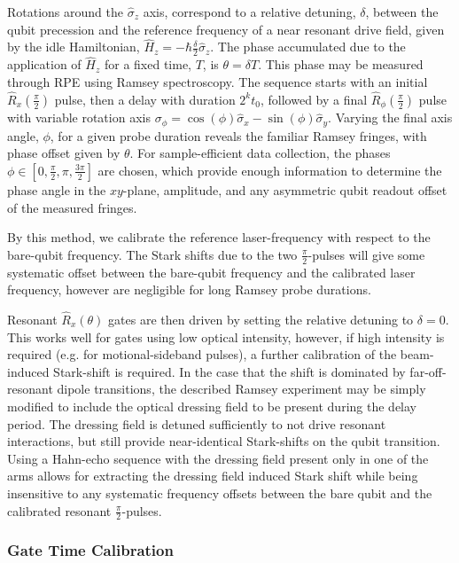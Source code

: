 Rotations around the $\hat\sigma_z$ axis, correspond to a relative detuning,
$\delta$, between the qubit precession and the reference frequency of a near resonant drive field, given by
the idle Hamiltonian, $\hat H_z = -\hbar\frac{\delta}{2}\hat\sigma_z$. The phase
accumulated due to the application of $\hat H_z$ for a fixed time, $T$, is
$\theta = \delta T$. This phase may be measured through RPE using Ramsey
spectroscopy. The sequence starts with an initial $\hat R_x(\frac{\pi}{2})$ pulse,
then a delay with duration $2^kt_0$, followed by a final $\hat R_\phi(\frac{\pi}{2})$
pulse with variable rotation axis $\sigma_\phi = \cos(\phi)\hat\sigma_x -
\sin(\phi)\hat\sigma_y$. Varying the final axis angle, $\phi$, for a given probe
duration reveals the familiar Ramsey fringes, with phase offset given by
$\theta$. For sample-efficient data collection, the phases
$\phi\in[0,\frac{\pi}{2},\pi,\frac{3\pi}{2}]$ are chosen, which provide enough
information to determine the phase angle in the $xy$-plane, amplitude, and any asymmetric qubit readout
offset of the measured fringes.

By this method, we calibrate the reference laser-frequency with respect to the
bare-qubit frequency. The Stark shifts due to the two $\frac{\pi}{2}$-pulses will
give some systematic offset between the bare-qubit frequency and the calibrated
laser frequency, however are negligible for long Ramsey probe durations.

Resonant $\hat R_x(\theta)$ gates are then driven by setting the relative detuning to
$\delta = 0$. This works well for gates using low optical intensity, however, if
high intensity is required (e.g. for motional-sideband pulses), a further
calibration of the beam-induced Stark-shift is required. In the case that the
shift is dominated by far-off-resonant dipole transitions, the described Ramsey
experiment may be simply modified to include the optical dressing field to be
present during the delay period. The dressing field is detuned sufficiently to
not drive resonant interactions, but still provide near-identical Stark-shifts
on the qubit transition. Using a Hahn-echo sequence with the dressing field
present only in one of the arms allows for extracting the dressing field induced
Stark shift while being insensitive to any systematic frequency offsets between
the bare qubit and the calibrated resonant $\frac{\pi}{2}$-pulses.


\subsubsection{Gate Time Calibration}

